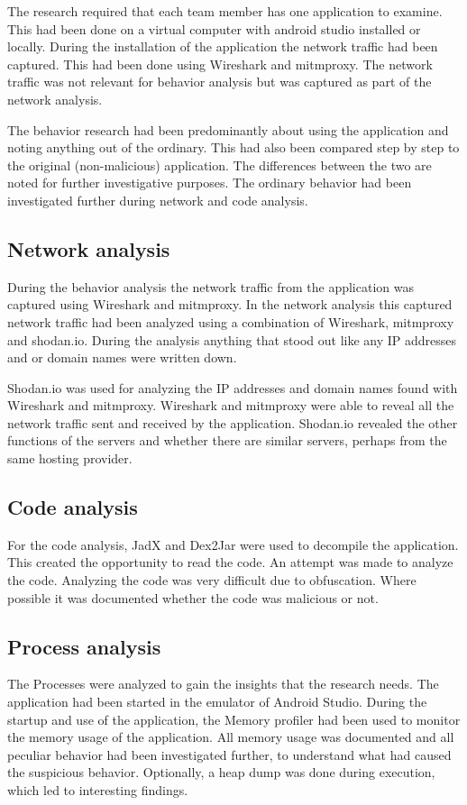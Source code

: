 The research required that each team member has one application to examine. This had been done on a virtual computer with android studio installed or locally. During the installation of the application the network traffic had been captured. This had been done using Wireshark and mitmproxy. The network traffic was not relevant for behavior analysis but was captured as part of the network analysis.

The behavior research had been predominantly about using the application and noting anything out of the ordinary. This had also been compared step by step to the original (non-malicious) application. The differences between the two are noted for further investigative purposes. The ordinary behavior had been investigated further during network and code analysis.

\subsection{Network analysis}

During the behavior analysis the network traffic from the application was captured using Wireshark and mitmproxy. In the network analysis this captured network traffic had been analyzed using a combination of Wireshark, mitmproxy and shodan.io. During the analysis anything that stood out like any IP addresses and or domain names were written down.

Shodan.io was used for analyzing the IP addresses and domain names found with Wireshark and mitmproxy. Wireshark and mitmproxy were able to reveal all the network traffic sent and received by the application. Shodan.io revealed the other functions of the servers and whether there are similar servers, perhaps from the same hosting provider.

\subsection{Code analysis}

For the code analysis, JadX and Dex2Jar were used to decompile the application. This created the opportunity to read the code. An attempt was made to analyze the code. Analyzing the code was very difficult due to obfuscation. Where possible it was documented whether the code was malicious or not.

\subsection{Process analysis}
The Processes were analyzed to gain the insights that the research needs. The application had been started in the emulator of Android Studio. During the startup and use of the application, the Memory profiler had been used to monitor the memory usage of the application. All memory usage was documented and all peculiar behavior had been investigated further, to understand what had caused the suspicious behavior. Optionally, a heap dump was done during execution, which led to interesting findings.

